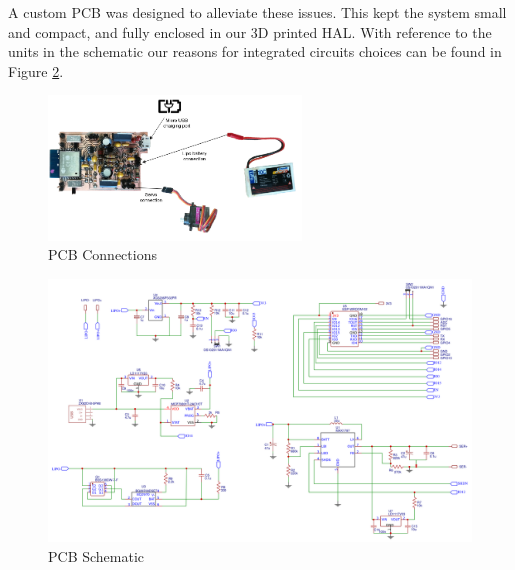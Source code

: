 \documentclass[onecolumn]{IEEEtran}
\begin{document}
     {A custom PCB was designed to alleviate these issues. This kept the system small and compact, and fully enclosed in our 3D printed HAL. With reference to the units in the schematic our reasons for integrated circuits choices can be found in Figure \ref{fig:pcbsch}.
     
      
         \begin{figure}[h]
            \begin{center}
               \includegraphics[width=0.6\textwidth]{images/PCB-Connection.png}
               \caption{PCB Connections}
               \label{fig:pcb}
            \end{center}
        \end{figure}
     
     
        
         \begin{figure}[h]
            \begin{center}
               \includegraphics[width=1\textwidth]{images/PCB-sch.png}
               \caption{PCB Schematic}
               \label{fig:pcbsch}
            \end{center}
        \end{figure}
        \newpage
        
}
\end{document}
